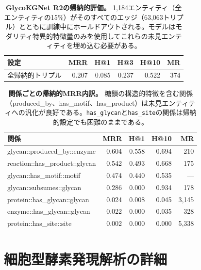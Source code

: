 \documentclass[11pt,a4paper]{ltjsarticle}
\begin{document}
\begin{table}[H]
\centering
\caption{\textbf{GlycoKGNet R2の帰納的評価。}
1,184エンティティ（全エンティティの15\%）がそのすべてのエッジ（63,063トリプル）とともに訓練中にホールドアウトされる。モデルはモダリティ特異的特徴量のみを使用してこれらの未見エンティティを埋め込む必要がある。}
\label{tab:inductive}
\small
\begin{tabular}{lrrrrr}
\toprule
\textbf{設定} & \textbf{MRR} & \textbf{H@1} & \textbf{H@3} & \textbf{H@10} & \textbf{MR} \\
\midrule
全帰納的トリプル & 0.207 & 0.085 & 0.237 & 0.522 & 374 \\
\bottomrule
\end{tabular}
\end{table}

\begin{table}[H]
\centering
\caption{\textbf{関係ごとの帰納的MRR内訳。}
糖鎖の構造的特徴を含む関係（produced\_by、has\_motif、has\_product）は未見エンティティへの汎化が良好である。\texttt{has\_glycan}と\texttt{has\_site}の関係は帰納的設定でも困難のままである。}
\label{tab:inductive_per_relation}
\small
\begin{tabular}{lrrrr}
\toprule
\textbf{関係} & \textbf{MRR} & \textbf{H@1} & \textbf{H@10} & \textbf{MR} \\
\midrule
glycan::produced\_by::enzyme    & 0.604 & 0.558 & 0.694 & 210 \\
reaction::has\_product::glycan  & 0.542 & 0.493 & 0.668 & 175 \\
glycan::has\_motif::motif       & 0.474 & 0.440 & 0.535 & --- \\
glycan::subsumes::glycan        & 0.286 & 0.000 & 0.934 & 178 \\
\midrule
protein::has\_glycan::glycan    & 0.024 & 0.008 & 0.045 & 3,145 \\
enzyme::has\_glycan::glycan     & 0.022 & 0.000 & 0.035 & 328 \\
protein::has\_site::site        & 0.002 & 0.000 & 0.000 & 5,338 \\
\bottomrule
\end{tabular}
\end{table}

\section{細胞型酵素発現解析の詳細}
\label{sec:celltype_details}
\end{document}
